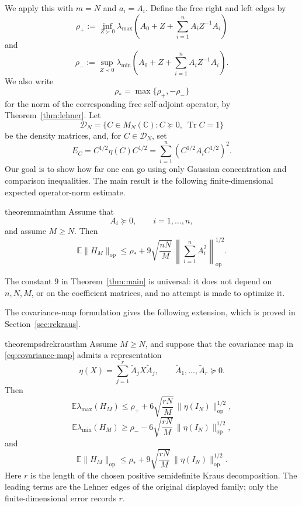 \documentclass{article}
\newcommand{\C}{\mathbb C}
\newcommand{\E}{\mathbb E}
\newcommand{\DN}{\mathcal D_N}
\newcommand{\op}{\mathrm{op}}
\newcommand{\Arow}{\left\|\sum_{i=1}^n A_i^2\right\|_{\op}^{1/2}}
\DeclareMathOperator{\Tr}{Tr}
\begin{document}
We apply this with $m=N$ and $a_i=A_i$.  Define the free right and left edges by
\begin{equation}
	\label{eq:rho-plus}
	\rho_+:=\inf_{Z\succ0}\lambda_{\max}\left(A_0+Z+\sum_{i=1}^n A_iZ^{-1}A_i\right)
\end{equation}
and
\begin{equation}
	\label{eq:rho-minus}
	\rho_-:=\sup_{Z\prec0}\lambda_{\min}\left(A_0+Z+\sum_{i=1}^n A_iZ^{-1}A_i\right).
\end{equation}
We also write
\[
	\rho_*=\max\{\rho_+,-\rho_-\}
\]
for the norm of the corresponding free self-adjoint operator, by
Theorem~\ref{thm:lehner}.
Let
\[
	\DN=\{C\in M_N(\C):C\succeq0,\ \Tr C=1\}
\]
be the density matrices, and, for \(C\in\DN\), set
\begin{equation}
	\label{eq:EC}
	E_C
	=
	C^{1/2}\eta(C)C^{1/2}
	=
	\sum_{i=1}^n(C^{1/2}A_iC^{1/2})^2.
\end{equation}
Our goal is to show
how far one can go using only Gaussian concentration and comparison inequalities.
The main result is the following finite-dimensional expected operator-norm
estimate.

\begin{restatable*}{theorem}{mainthm}
	\label{thm:main}
	Assume that
	\[
		A_i\succeq0,\qquad i=1,\ldots,n,
	\]
	and assume $M\ge N$.  Then
	\[
		\E\|H_M\|_{\op}
		\le
		\rho_*+9\sqrt{\frac{nN}{M}}\,\Arow.
	\]
\end{restatable*}

The constant \(9\) in Theorem~\ref{thm:main} is universal: it does not depend on
\(n,N,M\), or on the coefficient matrices, and no attempt is made to optimize
it.

The covariance-map formulation gives the following extension, which is proved
in Section~\ref{sec:rekraus}.

\begin{restatable*}
	{theorem}{psdrekrausthm}
	\label{thm:psd-rekraus}
	Assume $M\ge N$, and suppose that the covariance map in
	\eqref{eq:covariance-map} admits a representation
	\[
		\eta(X)=\sum_{j=1}^r\widetilde A_jX\widetilde A_j,
		\qquad \widetilde A_1,\ldots,\widetilde A_r\succeq0.
	\]
	Then
	\[
		\E\lambda_{\max}(H_M)
		\le
		\rho_+
		+6\sqrt{\frac{rN}{M}}\,\|\eta(I_N)\|_{\op}^{1/2},
	\]
	\[
		\E\lambda_{\min}(H_M)
		\ge
		\rho_-
		-6\sqrt{\frac{rN}{M}}\,\|\eta(I_N)\|_{\op}^{1/2},
	\]
	and
	\[
		\E\|H_M\|_{\op}
		\le
		\rho_*
		+9\sqrt{\frac{rN}{M}}\,\|\eta(I_N)\|_{\op}^{1/2}.
	\]
	Here \(r\) is the length of the chosen positive semidefinite Kraus
	decomposition.  The leading terms are the Lehner edges of the original
	displayed family; only the finite-dimensional error records \(r\).
\end{restatable*}
\end{document}
